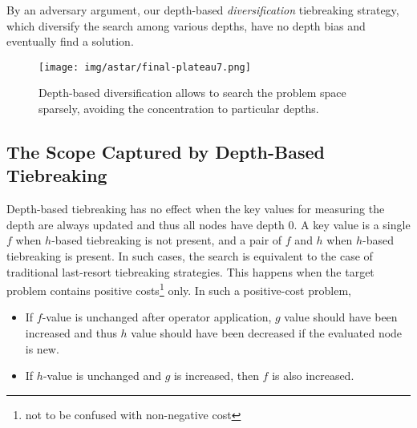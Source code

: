 By an adversary argument, our depth-based \emph{diversification}
tiebreaking strategy, which diversify the search among various depths,
have no depth bias and eventually find a solution.

\begin{figure}[htbp]
 \texttt{[image: img/astar/final-plateau7.png]}
 \caption{Depth-based diversification allows \astar to search the problem space
 sparsely, avoiding the concentration to particular depths.}
 \label{fig:plateau-depiction-all-optimal}
\end{figure}


\subsection{The Scope Captured by Depth-Based Tiebreaking}

Depth-based tiebreaking has no effect when the key values for measuring
the depth are always updated and thus all nodes have depth 0. A key
value is a single $f$ when $h$-based tiebreaking is not present, and a
pair of $f$ and $h$ when $h$-based tiebreaking is present.  In such
cases, the search is equivalent to the case of traditional last-resort
tiebreaking strategies.
% 
This happens when the target problem contains
positive costs\footnote{not to be confused with non-negative cost} only.
In such a positive-cost problem,
\begin{itemize}
 \item If $f$-value is unchanged after operator application, $g$ value
       should have been increased and thus $h$ value should have been
       decreased if the evaluated node is new.
 \item If $h$-value is unchanged and $g$ is increased, then $f$ is also increased.
\end{itemize}

% 


